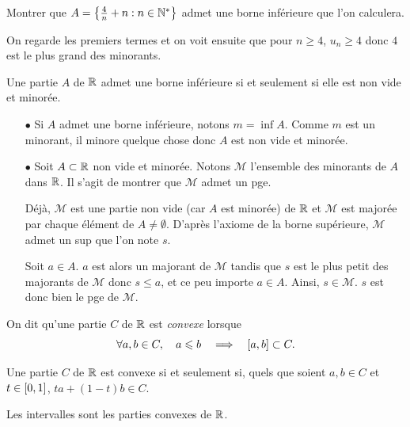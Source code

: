 \documentclass{magnoliaold}
\begin{document}
\begin{exoUnique}
\exo Montrer que $A=\left\{\frac{4}{n}+n : n\in{\mathbb{N}^*}\right\}$ admet une borne
  inférieure que l'on calculera.
\end{exoUnique}
\begin{sol}
On regarde les premiers termes et on voit ensuite que pour $n\geq 4$, $u_n\geq 4$ donc $4$ est le plus grand des minorants.
\end{sol}

\begin{proposition}
Une partie $A$ de $\mathbb{R}$ admet une borne inférieure si et seulement si elle est
non vide et minorée.
\end{proposition}

\begin{preuve}
\begin{itemize}
\item[$\bullet$]
Si $A$ admet une borne inférieure, notons $m=\inf A$. Comme $m$ est un minorant, il minore quelque chose donc $A$ est non vide et minorée.
\item [$\bullet$]
Soit $A\subset \mathbb{R}$ non vide et minorée. Notons $\mathcal{M}$ l'ensemble des minorants de $A$ dans $\mathbb{R}$. Il s'agit de montrer que $\mathcal{M}$ admet un pge.

Déjà, $\mathcal{M}$ est une partie non vide (car $A$ est minorée) de $\mathbb{R}$ et $\mathcal{M}$ est majorée par chaque élément de $A\neq \emptyset$. D'après l'axiome de la borne supérieure, $\mathcal{M}$ admet un sup que l'on note $s$.

Soit $a\in A$. $a$ est alors un majorant de $\mathcal{M}$ tandis que $s$ est le plus petit des majorants de $\mathcal{M}$ donc $s\leq a$, et ce peu importe $a\in A$. Ainsi, $s\in \mathcal{M}$. $s$ est donc bien le pge de $\mathcal{M}$.
\end{itemize}
\end{preuve}

\begin{definition}
On dit qu'une partie $C$ de $\mathbb{R}$ est \emph{convexe} lorsque
\[\forall a,b\in C ,\quad a\leqslant b \quad\Longrightarrow\quad [a,b]\subset C.\]
\end{definition}

\begin{remarqueUnique}
\remarque Une partie $C$ de $\mathbb{R}$ est convexe si et seulement si, quels
que soient $a,b\in C$ et $t\in\left[0,1\right]$, $ta+(1-t)b\in C$.
\end{remarqueUnique}

\begin{theoreme}
Les intervalles sont les parties convexes de $\mathbb{R}$.
\end{theoreme}
\end{document}
